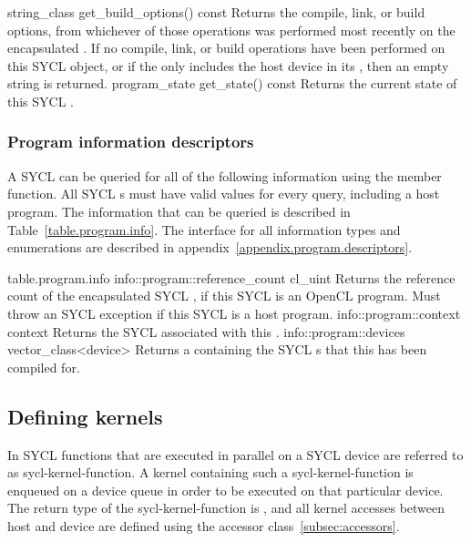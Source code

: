   \addRow
    {string_class get_build_options() const}
    {
       Returns the compile, link, or build options, from whichever of those operations was performed most recently on the encapsulated .  If no compile, link, or build operations have been performed on this SYCL  object, or if the  only includes the host device in its , then an empty string is returned.
    }
  \addRow
    {program_state get_state() const}
    {
       Returns the current state of this SYCL .
    }
\completeTable

\subsubsection{Program information descriptors}

A SYCL  can be queried for all of the following information using the  member function. All SYCL s must have valid values for every query, including a host program. The information that can be queried is described in Table~\ref{table.program.info}. The interface for all information types and enumerations are described in appendix~\ref{appendix.program.descriptors}.

{table.program.info}
\addInfoRow
    {info::program::reference_count}
    {cl_uint}
    {
      Returns the reference count of the encapsulated SYCL ,
  if this SYCL  is an OpenCL program. Must throw an  SYCL exception if this SYCL  is a host program.
    }
\addInfoRow
    {info::program::context}
    {context}
    {
      Returns the SYCL  associated with this .
    }
  \addInfoRow
    {info::program::devices}
    {vector_class<device>}
    {
      Returns a  containing the SYCL s that this  has been compiled for.
    }
\completeInfoTable

\subsection{Defining kernels}
In SYCL functions that are executed in parallel on a SYCL device are referred to
as \gls{sycl-kernel-function}. A \gls{kernel} containing such a
\gls{sycl-kernel-function} is enqueued on a device queue in order to
be executed on
that particular device. The return type of the \gls{sycl-kernel-function} is
, and all kernel accesses between host and device are defined using the
accessor class~\ref{subsec:accessors}.

